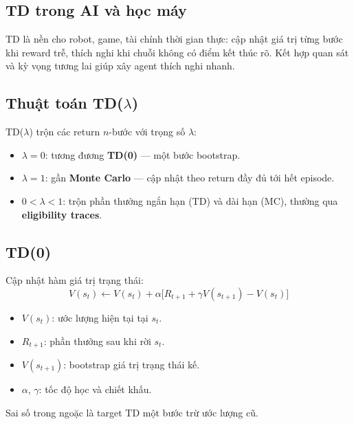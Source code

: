 \subsection{TD trong AI và học máy}

\begin{ynghia}[title={Vai trò thực tiễn}]
TD là nền cho robot, game, tài chính thời gian thực: cập nhật giá trị từng bước khi reward trễ, thích nghi khi chuỗi không có điểm kết thúc rõ. Kết hợp quan sát và kỳ vọng tương lai giúp xây agent thích nghi nhanh.
\end{ynghia}

\subsection{Thuật toán TD($\lambda$)}

\begin{ynghia}[title={TD($\lambda$)}]
TD($\lambda$) trộn các return $n$-bước với trọng số $\lambda$:
\begin{itemize}
  \item $\lambda = 0$: tương đương \textbf{TD(0)} --- một bước bootstrap.
  \item $\lambda = 1$: gần \textbf{Monte Carlo} --- cập nhật theo return đầy đủ tới hết episode.
  \item $0 < \lambda < 1$: trộn phần thưởng ngắn hạn (TD) và dài hạn (MC), thường qua \textbf{eligibility traces}.
\end{itemize}
\end{ynghia}

\subsection{TD(0)}

\begin{dinhnghia}[title={Quy tắc TD(0) (one-step)}]
Cập nhật hàm giá trị trạng thái:
\[
V(s_t) \leftarrow V(s_t) + \alpha\bigl[R_{t+1} + \gamma V(s_{t+1}) - V(s_t)\bigr]
\]
\begin{itemize}
  \item $V(s_t)$: ước lượng hiện tại tại $s_t$.
  \item $R_{t+1}$: phần thưởng sau khi rời $s_t$.
  \item $V(s_{t+1})$: bootstrap giá trị trạng thái kế.
  \item $\alpha$, $\gamma$: tốc độ học và chiết khấu.
\end{itemize}
Sai số trong ngoặc là target TD một bước trừ ước lượng cũ.
\end{dinhnghia}

